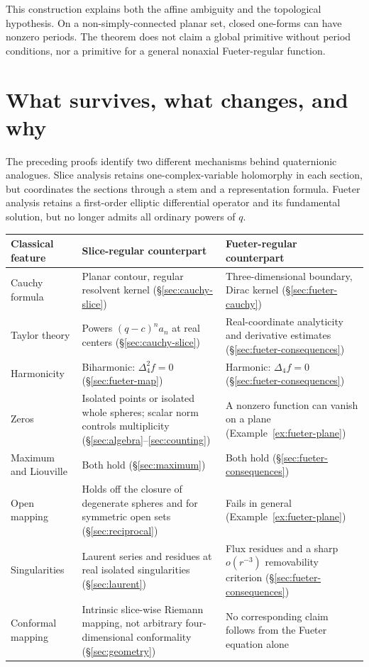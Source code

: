 \documentclass[11pt,a4paper]{article}
\numberwithin{equation}{section}
\theoremstyle{definition}
\theoremstyle{remark}
\newcommand{\lap}{\Delta_4}
\begin{document}
This construction explains both the affine ambiguity and the topological
hypothesis. On a non-simply-connected planar set, closed one-forms can have
nonzero periods. The theorem does not claim a global primitive without
period conditions, nor a primitive for a general nonaxial Fueter-regular
function.

\section{What survives, what changes, and why}
\label{sec:comparison}
The preceding proofs identify two different mechanisms behind quaternionic
analogues. Slice analysis retains one-complex-variable holomorphy in each
section, but coordinates the sections through a stem and a representation
formula. Fueter analysis retains a first-order elliptic differential
operator and its fundamental solution, but no longer admits all ordinary
powers of $q$.

\begin{center}
\small
\renewcommand{\arraystretch}{1.22}
\begin{tabularx}{\textwidth}{@{}p{}XX@{}}
\toprule
Classical feature & Slice-regular counterpart & Fueter-regular counterpart\\
\midrule
Cauchy formula & Planar contour, regular resolvent kernel
(\S\ref{sec:cauchy-slice}) & Three-dimensional boundary, Dirac kernel
(\S\ref{sec:fueter-cauchy})\\
Taylor theory & Powers $(q-c)^n a_n$ at real centers
(\S\ref{sec:cauchy-slice}) & Real-coordinate analyticity and derivative
estimates (\S\ref{sec:fueter-consequences})\\
Harmonicity & Biharmonic: $\lap^2f=0$
(\S\ref{sec:fueter-map}) & Harmonic: $\lap f=0$
(\S\ref{sec:fueter-consequences})\\
Zeros & Isolated points or isolated whole spheres; scalar norm controls
multiplicity (\S\ref{sec:algebra}--\ref{sec:counting}) & A nonzero function
can vanish on a plane (Example~\ref{ex:fueter-plane})\\
Maximum and Liouville & Both hold
(\S\ref{sec:maximum}) & Both hold
(\S\ref{sec:fueter-consequences})\\
Open mapping & Holds off the closure of degenerate spheres and for
symmetric open sets (\S\ref{sec:reciprocal}) & Fails in general
(Example~\ref{ex:fueter-plane})\\
Singularities & Laurent series and residues at real isolated singularities
(\S\ref{sec:laurent}) & Flux residues and a sharp $o(r^{-3})$ removability
criterion (\S\ref{sec:fueter-consequences})\\
Conformal mapping & Intrinsic slice-wise Riemann mapping, not arbitrary
four-dimensional conformality (\S\ref{sec:geometry}) & No corresponding
claim follows from the Fueter equation alone\\
\bottomrule
\end{tabularx}
\end{center}
\end{document}
